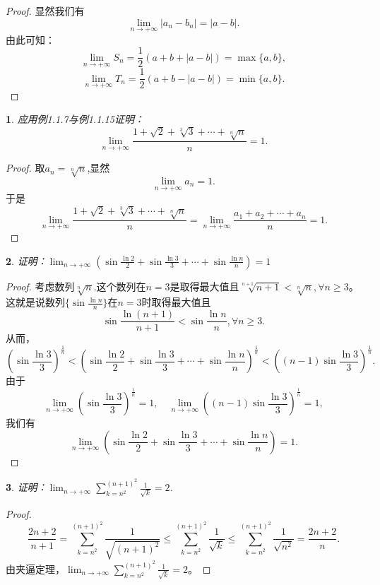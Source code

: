 \documentclass[utf8]{book}
\newtheorem{example}{}[section]             %
\begin{document}
\begin{proof}
显然我们有$$\displaystyle \lim_{n\to +\infty}|a_n-b_n| = |a-b|.$$
由此可知：
$$\displaystyle \lim_{n\to +\infty}S_n = \frac{1}{2}(a+b+|a-b|) = \max\{a,b\},$$
$$\displaystyle \lim_{n\to +\infty}T_n = \frac{1}{2}(a+b-|a-b|) = \min\{a,b\}.$$
\end{proof}

\begin{example}
应用例1.1.7与例1.1.15证明：
$$\displaystyle \lim_{n\to +\infty}\frac{1+\sqrt{2}+\sqrt[3]{3}+\cdots+\sqrt[n]{n}}{n} = 1.$$
\end{example}
\begin{proof}
取$a_n = \sqrt[n]{n}$,显然$$\displaystyle \lim_{n\to +\infty}a_n=1.$$于是
$$\displaystyle \lim_{n\to +\infty}\frac{1+\sqrt{2}+\sqrt[3]{3}+\cdots+\sqrt[n]{n}}{n} = \displaystyle \lim_{n\to +\infty}\frac{a_1+a_2+\cdots+a_n}{n} = 1.$$
\end{proof}
\begin{example}
证明：$\displaystyle \lim_{n\to +\infty}\left(\sin\frac{\ln 2}{2}+\sin\frac{\ln 3}{3} +\cdots+\sin\frac{\ln n}{n}\right) = 1$
\end{example}
\begin{proof}
考虑数列$\sqrt[n]{n}$.这个数列在$n=3$是取得最大值且$\displaystyle \sqrt[n+1]{n+1} < \sqrt[n]{n}, \forall n \geq 3$。
这就是说数列$\{\sin\frac{\ln n}{n}\}$在$n=3$时取得最大值且$$\displaystyle \sin\frac{\ln{(n+1)}}{n+1} < \sin\frac{\ln{n}}{n}, \forall n \geq 3.$$
从而，
$$\left(\sin\frac{\ln 3}{3}\right)^{\frac{1}{n}} < \left(\sin\frac{\ln 2}{2}+\sin\frac{\ln 3}{3} +\cdots+\sin\frac{\ln n}{n}\right)^{\frac{1}{n}} < \left((n-1)\sin\frac{\ln 3}{3}\right)^{\frac{1}{n}}.$$
由于$$\displaystyle \lim_{n\to +\infty}\left(\sin\frac{\ln 3}{3}\right)^{\frac{1}{n}} = 1, \quad\displaystyle \lim_{n\to +\infty}\left((n-1)\sin\frac{\ln 3}{3}\right)^{\frac{1}{n}} = 1,$$我们有
$$\displaystyle \lim_{n\to +\infty}\left(\sin\frac{\ln 2}{2}+\sin\frac{\ln 3}{3} +\cdots+\sin\frac{\ln n}{n}\right) = 1.$$ 
\end{proof}
\begin{example}
证明：$\displaystyle \lim_{n\to +\infty}\displaystyle\sum_{k=n^2}^{(n+1)^2}\frac{1}{\sqrt k}= 2$.
\end{example}
\begin{proof}
$$\frac{2n+2}{n+1} = \displaystyle\sum_{k=n^2}^{(n+1)^2}\frac{1}{\sqrt{(n+1)^2}} \leq \displaystyle\sum_{k=n^2}^{(n+1)^2}\frac{1}{\sqrt k} \leq \displaystyle\sum_{k=n^2}^{(n+1)^2}\frac{1}{\sqrt{n^2}} = \frac{2n+2}{n}.$$
由夹逼定理，$\displaystyle \lim_{n\to +\infty}\displaystyle\sum_{k=n^2}^{(n+1)^2}\frac{1}{\sqrt k}= 2$。
\end{proof}
\end{document}
